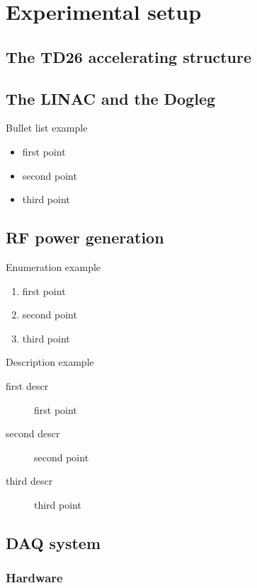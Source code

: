\chapter[Experimental setup]{Experimental setup}

\section[Main beam accelerating structure]{The TD26 accelerating structure}

\section[Linac and dogleg]{The LINAC and the Dogleg}

Bullet list example
\begin{itemize}
\item first point
\item second point
\item third point \\
\end{itemize}

\section[RF power generation]{RF power generation}

\noindent
Enumeration example
\begin{enumerate}
\item first point
\item second point
\item third point\\
\end{enumerate}

\noindent
Description example
\begin{description}
\item[first descr] first point
\item[second descr]  second point
\item[third descr]  third point\\
\end{description}

\section[DAQ system]{DAQ system}

\subsection[Hardware]{Hardware}

